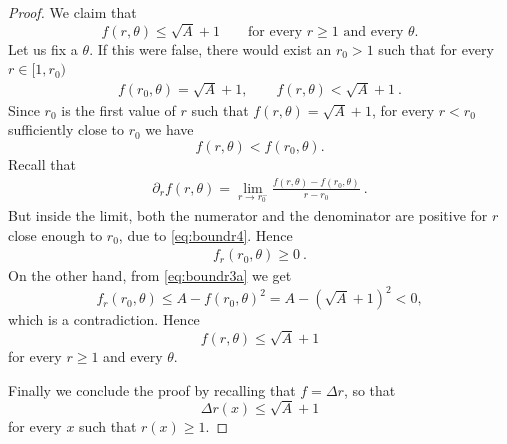 \documentclass[a4paper,11pt,openright,twoside]{book}
\newcommand{\1}{\mathds{1}}
\theoremstyle{plain}
\theoremstyle{definition}
\theoremstyle{remark}
\begin{document}
\begin{proof}
We claim that
\[
f(r,\theta)\le \sqrt{A}+1
\qquad\text{for every }r\ge 1\text{ and every }\theta.
\]
Let us fix a $\theta$. If this were false, there would exist an $r_0>1$ such that for every $r\in [1,r_0)$
\begin{align}\label{eq:boundr4}
	f(r_0,\theta)=\sqrt{A}+1,
	\qquad
	f(r,\theta)<\sqrt{A}+1 
\ . 
\end{align}
Since $r_0$ is the first value of $r$ such that $f(r,\theta)=\sqrt A+1$, for every $r<r_0$ sufficiently close to $r_0$ we have
\[
f(r,\theta)<f(r_0,\theta).
\]
Recall that 
\begin{align*}
	\partial_r f(r,\theta) = \lim_{r\to r_0^-} \frac{f(r,\theta)-f(r_0,\theta)}{r-r_0} 
\ . 
\end{align*}
But inside the limit, both the numerator and the denominator are positive for $r$ close enough to $r_0$, due to \eqref{eq:boundr4}.
Hence 
\begin{align*}
	f_r(r_0,\theta) \geq 0
\ . 
\end{align*}
On the other hand, from \ref{eq:boundr3a} we get
\[
f_r(r_0,\theta)
\le
A-f(r_0,\theta)^2
=
A-(\sqrt{A}+1)^2
<
0,
\]
which is a contradiction. Hence
\[
f(r,\theta)\le \sqrt{A}+1
\]
for every $r\ge 1$ and every $\theta$.

Finally we conclude the proof by recalling that $f=\Delta r$, so that
\[
\Delta r(x)\le \sqrt{A}+1
\]
for every $x$ such that $r(x)\ge 1$.
\end{proof}
\end{document}
